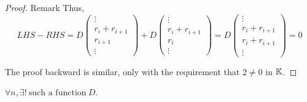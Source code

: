 \begin{proof} {Remark}
    Thus, \[
    LHS - RHS = D \left(\begin{array}{c}
        \vdots \\ r_i + r_{i+1} \\ r_{i+1} \\ \vdots
    \end{array}\right) + D\left(\begin{array}{c}
        \vdots \\ r_i + r_{i+1} \\ r_i \\ \vdots
    \end{array}\right) = D\left(\begin{array}{c}
        \vdots \\ r_i + r_{i+1} \\ r_i + r_{i+1} \\ \vdots
    \end{array}\right) = 0
    \]

    \pfbwd The proof backward is similar, only with the requirement that \(2 \neq 0\) in \(\mathbb{K}\).
\end{proof}

\begin{proposition}
    \(\forall n, \exists! \:\text{such a function}\: D\).
\end{proposition}

